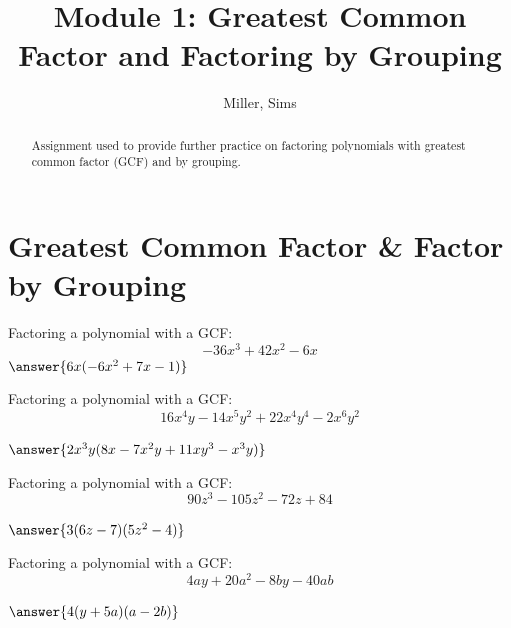 \documentclass[handout]{ximera}
\title{Module 1: Greatest Common Factor and Factoring by Grouping}
\author{Miller, Sims}
\begin{document}
\begin{abstract}
    Assignment used to provide further practice on factoring polynomials with greatest common factor (GCF) and by grouping.
\end{abstract}

\section{Greatest Common Factor \& Factor by Grouping}

\begin{problem}
    Factoring a polynomial with a GCF: $$-36x^3+42x^2-6x$$
    $\answer{6x(-6x^2+7x-1)}$
\end{problem}

\begin{problem}
    Factoring a polynomial with a GCF: $$16x^4y-14x^5y^2+22x^4y^4-2x^6y^2$$
    
    $\answer{2x^3y(8x-7x^2y+11xy^3-x^3y)}$
\end{problem}

\begin{problem}
    Factoring a polynomial with a GCF: $$90z^3-105z^2-72z+84$$
    
    $\answer{3(6z-7)(5z^2-4)}$
\end{problem}

\begin{problem}
    Factoring a polynomial with a GCF: $$4ay+20a^2-8by-40ab$$
    
    $\answer{4(y+5a)(a-2b)}$
\end{problem}
\end{document}
